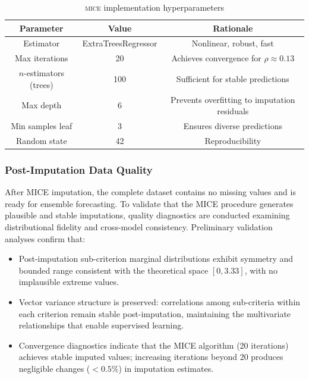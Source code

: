 \documentclass[12pt,a4paper]{article}
\newcommand{\MICE}{\textsc{mice}\xspace}
\begin{document}
\begin{table}[!ht]
\centering
\caption{\MICE implementation hyperparameters}
\label{tab:mice_hyperparams}
\small
\begin{tabular}{c c c}
\toprule
\textbf{Parameter} & \textbf{Value} & \textbf{Rationale} \\
\midrule
Estimator & ExtraTreesRegressor & Nonlinear, robust, fast \\
Max iterations & 20 & Achieves convergence for $\rho \approx 0.13$ \\
$n$-estimators (trees) & 100 & Sufficient for stable predictions \\
Max depth & 6 & Prevents overfitting to imputation residuals \\
Min samples leaf & 3 & Ensures diverse predictions \\
Random state & 42 & Reproducibility \\
\bottomrule
\end{tabular}
\end{table}

\subsubsection{Post-Imputation Data Quality}

After MICE imputation, the complete dataset contains no missing values and is ready for ensemble forecasting. To validate that the MICE procedure generates plausible and stable imputations, quality diagnostics are conducted examining distributional fidelity and cross-model consistency. Preliminary validation analyses confirm that:
\begin{itemize}[itemsep=2pt]
  \item Post-imputation sub-criterion marginal distributions exhibit symmetry and bounded range consistent with the theoretical space $[0, 3.33]$, with no implausible extreme values.
  \item Vector variance structure is preserved: correlations among sub-criteria within each criterion remain stable post-imputation, maintaining the multivariate relationships that enable supervised learning.
  \item Convergence diagnostics indicate that the MICE algorithm (20 iterations) achieves stable imputed values; increasing iterations beyond 20 produces negligible changes ($< 0.5\%$) in imputation estimates.
\end{itemize}
\end{document}

